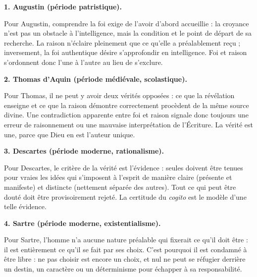 \documentclass[11pt]{article}
\begin{document}
\begin{corrige}

\textbf{1. Augustin (période patristique).}\par Pour Augustin, comprendre la foi exige de l'avoir d'abord accueillie : la croyance n'est pas un obstacle à l'intelligence, mais la condition et le point de départ de sa recherche. La raison n'éclaire pleinement que ce qu'elle a préalablement reçu ; inversement, la foi authentique désire s'approfondir en intelligence. Foi et raison s'ordonnent donc l'une à l'autre au lieu de s'exclure.

\textbf{2. Thomas d'Aquin (période médiévale, scolastique).}\par Pour Thomas, il ne peut y avoir deux vérités opposées : ce que la révélation enseigne et ce que la raison démontre correctement procèdent de la même source divine. Une contradiction apparente entre foi et raison signale donc toujours une erreur de raisonnement ou une mauvaise interprétation de l'Écriture. La vérité est une, parce que Dieu en est l'auteur unique.

\textbf{3. Descartes (période moderne, rationalisme).}\par Pour Descartes, le critère de la vérité est l'évidence : seules doivent être tenues pour vraies les idées qui s'imposent à l'esprit de manière claire (présente et manifeste) et distincte (nettement séparée des autres). Tout ce qui peut être douté doit être provisoirement rejeté. La certitude du \emph{cogito} est le modèle d'une telle évidence.

\textbf{4. Sartre (période moderne, existentialisme).}\par Pour Sartre, l'homme n'a aucune nature préalable qui fixerait ce qu'il doit être : il est entièrement ce qu'il se fait par ses choix. C'est pourquoi il est \guillemotleft condamné à être libre \guillemotright : ne pas choisir est encore un choix, et nul ne peut se réfugier derrière un destin, un caractère ou un déterminisme pour échapper à sa responsabilité.

\end{corrige}
\end{document}
